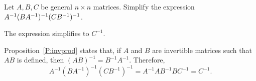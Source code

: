 \documentclass{ximera}
\begin{document}
\begin{exercise} \label{c4.8.4}
Let $A,B,C$ be general $n\times n$ matrices.  Simplify the expression
$A^{-1}(BA^{-1})^{-1}(CB^{-1})^{-1}$.

\begin{solution}

\ans The expression simplifies to $C^{-1}$.

\soln Proposition~\ref{P:invprod} states that, if $A$ and $B$ are
invertible matrices such that $AB$ is defined, then $(AB)^{-1} =
B^{-1}A^{-1}$.  Therefore,
\[
A^{-1}(BA^{-1})^{-1}(CB^{-1})^{-1} = A^{-1}AB^{-1}BC^{-1} = C^{-1}.
\]

\end{solution}
\end{exercise}
\end{document}

